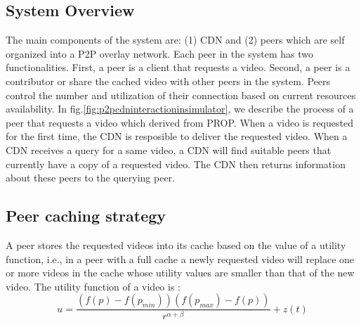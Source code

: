 \documentclass[10pt,final,journal,a4paper]{IEEEtran}
\begin{document}
\subsection{System Overview}\label{systemoverview}
The main components of the system are: (1) CDN and (2) peers which are self organized into a P2P overlay network.
Each peer in the system has two functionalities.
First, a peer is a client that requests a video. 
Second, a peer is a contributor or share the cached video with other peers in the system. 
Peers control the number and utilization of their connection based on current resources availability.
In fig.\ref{fig:p2pcdninteractioninsimulator}, we describe the process of a peer that requests a video which derived from PROP.
When a video is requested for the first time, the CDN is resposible to deliver the requested video.
When a CDN receives a query for a same video, a CDN will find suitable peers that currently have a copy of a requested video.
The CDN then returns information about these peers to the querying peer.


\subsection{Peer caching strategy}\label{peercachingstrategy}
A peer stores the requested videos into its cache based on the value of a utility function, i.e., in a peer with a full cache a newly requested video will replace one or more videos in the cache whose utility values are smaller than that of the new video.
The utility function of a video is :
\begin{equation}
u = \frac{ (f(p) - f(p_{min})) (f(p_{max}) - f(p)) }{r^{\alpha + \beta}} + z(t)
\end{equation}
\end{document}
